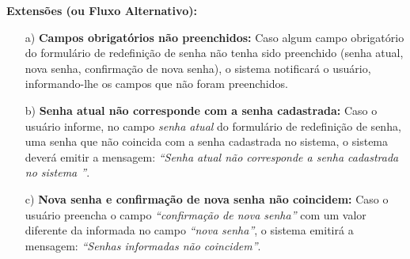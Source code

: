 \begin{mdframed}
\begin{flushleft}
		\textbf{Extensões (ou Fluxo Alternativo):}
		\begin{itemize}
			\item[a)] \textbf{Campos obrigatórios não preenchidos:} Caso algum campo obrigatório do formulário de redefinição de senha não tenha sido preenchido (senha atual, nova senha, confirmação de nova senha), o sistema notificará o usuário, informando-lhe os campos que não foram preenchidos.
			\item[b)] \textbf{Senha atual não corresponde com a senha cadastrada:} Caso o usuário informe, no campo \textit{senha atual} do formulário de redefinição de senha, uma senha que não coincida com a senha cadastrada no sistema, o sistema deverá emitir a mensagem: \textit{``Senha atual não corresponde a senha cadastrada no sistema ''}.
			\item[c)] \textbf{Nova senha e confirmação de nova senha não coincidem:} Caso o usuário preencha o campo \textit{``confirmação de nova senha''} com um valor diferente da informada no campo \textit{``nova senha''}, o sistema emitirá a mensagem: \textit{``Senhas informadas não coincidem''}.
		\end{itemize}


		\end{flushleft}

	\end{mdframed}


